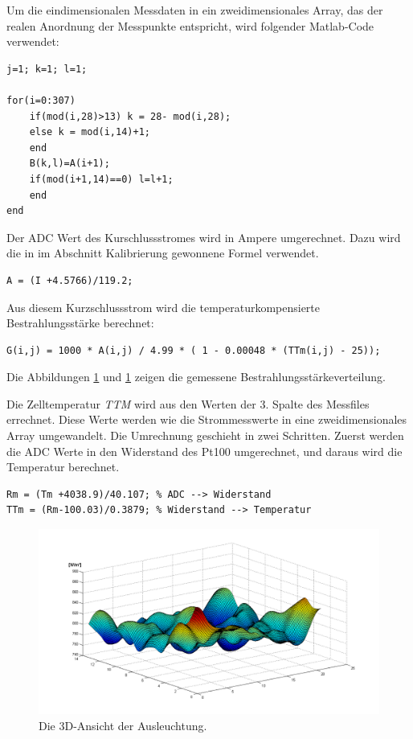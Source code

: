 \documentclass[a4paper,bibtotoc,oneside]{scrbook}
\begin{document}
Um die eindimensionalen Messdaten in ein zweidimensionales Array, das der realen Anordnung der Messpunkte entspricht, wird folgender Matlab-Code verwendet:
\begin{verbatim}
j=1; k=1; l=1;

for(i=0:307)
    if(mod(i,28)>13) k = 28- mod(i,28);
    else k = mod(i,14)+1;
    end
    B(k,l)=A(i+1);
    if(mod(i+1,14)==0) l=l+1;
    end
end
\end{verbatim}

Der ADC Wert des Kurschlussstromes wird in Ampere umgerechnet. Dazu wird die in im Abschnitt Kalibrierung gewonnene Formel verwendet.
\begin{verbatim}
A = (I +4.5766)/119.2; 
\end{verbatim}
Aus diesem Kurzschlussstrom wird die temperaturkompensierte Bestrahlungsstärke berechnet:
\begin{verbatim}
G(i,j) = 1000 * A(i,j) / 4.99 * ( 1 - 0.00048 * (TTm(i,j) - 25));
\end{verbatim}
Die Abbildungen \ref{g3d} und \ref{g3d} zeigen die gemessene Bestrahlungsstärkeverteilung.

Die Zelltemperatur \textit{TTM} wird aus den Werten der 3. Spalte des Messfiles errechnet. Diese Werte werden wie die Strommesswerte in eine zweidimensionales Array umgewandelt. Die Umrechnung geschieht in zwei Schritten. Zuerst werden die ADC Werte in den Widerstand des Pt100 umgerechnet, und daraus wird die Temperatur berechnet.

\begin{verbatim}
Rm = (Tm +4038.9)/40.107; % ADC --> Widerstand
TTm = (Rm-100.03)/0.3879; % Widerstand --> Temperatur
\end{verbatim}



\begin{figure}[htbp]
\centering
\includegraphics[width=125mm]{img/g3d.png}
\caption{Die 3D-Ansicht der Ausleuchtung.}\label{g3d}
\end{figure}
\end{document}
